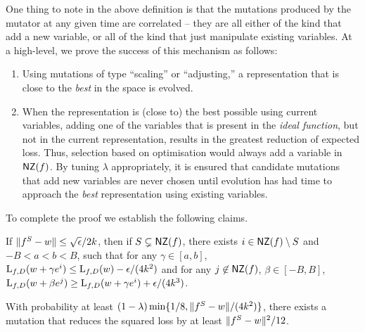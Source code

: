 One thing to note in the above definition is that the mutations produced by the
mutator at any given time are correlated -- \ie they are all either of the kind that
add a new variable, or all of the kind that just manipulate existing variables.
At a high-level, we prove the success of this mechanism as follows:
\begin{enumerate}
\item Using mutations of type ``scaling'' or ``adjusting,'' a representation
that is close to the \emph{best} in the space is evolved.
\item When the representation is (close to) the best possible using current
variables, adding one of the variables that is present in the \emph{ideal
function}, but not in the current representation,
results in the greatest reduction of expected loss. Thus, selection
based on optimisation would always add a variable in $\mathsf{NZ}(f)$. By tuning
$\lambda$ appropriately, it is ensured that candidate mutations that add new
variables are never chosen until evolution has had time to approach the
\emph{best} representation using existing variables.
\end{enumerate}

To complete the proof we establish the following claims.

\begin{claim} \label{claim:date} If $\Vert f^S - w \Vert \leq
\sqrt{\epsilon}/{2k}$, then if $S \subsetneq \mathsf{NZ}(f)$, there exists $i \in \mathsf{NZ}(f)
\setminus S$ and $-B < a < b < B$, such that for any $\gamma \in [a, b]$,
$\mathrm{L}_{f, D}(w + \gamma e^i) \leq \mathrm{L}_{f, D}(w) - \epsilon/(4k^2)$ and for
any $j \not\in \mathsf{NZ}(f)$, $\beta \in [-B, B]$, $\mathrm{L}_{f, D}(w + \beta e^j) \geq
\mathrm{L}_{f, D}(w + \gamma e^i) + \epsilon/(4k^3)$. \end{claim}

\begin{claim} \label{claim:elderberry} With probability at least $(1 - \lambda)
\min\{1/8, \Vert f^S - w \Vert/(4k^2)\}$, there exists a mutation that reduces the
squared loss by at least $\Vert f^S - w \Vert^2/12$. \end{claim}

